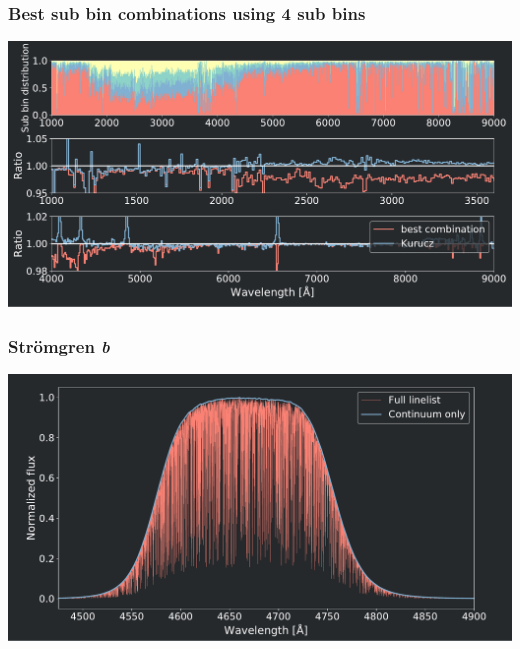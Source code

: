 {
	\centering	
	\frametitle{Best sub bin combinations using 4 sub bins}
	\includegraphics[width=140mm]{images/best_combination_finder_0}
}



\frame
{
	\frametitle{Str\"omgren \textit{b}}
	\centering
	\includegraphics[width=140mm]{images/b_filter}
}


